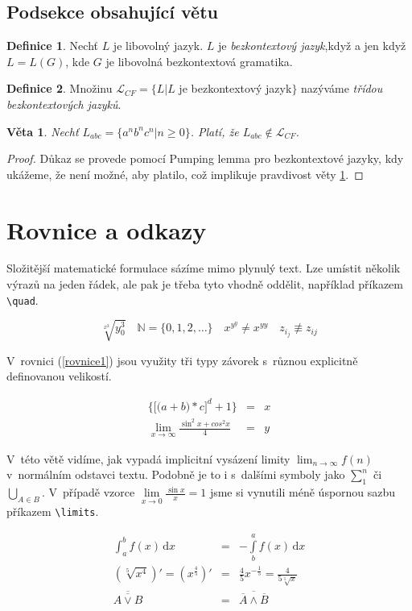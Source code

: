 \documentclass[a4paper,11pt,twocolumn]{article}
\theoremstyle{definition}
\newtheorem{definice}{Definice}[section]
\theoremstyle{plain}
\newtheorem{veta}{Věta}
\theoremstyle{definition}
\begin{document}
\subsection{Podsekce obsahující větu}
\begin{definice}
Nechť $L$ je libovolný jazyk. $L$ je \emph{ bezkontextový jazyk},když a jen když $L = L(G)$, kde $G$ je libovolná bezkontextová gramatika.
\end{definice}
\par
\begin{definice}
Množinu $\mathcal{L}_{CF} = \{L|L$ je bezkontextový jazyk$\}$ nazýváme \emph{třídou bezkontextových jazyků}.
\end{definice}
\par
\begin{veta}\label{veta1}
\emph{Nechť} $L_{abc} = \{a^nb^nc^n|n \geq 0\}$. \emph{Platí, že} $L_{abc} \not\in \mathcal{L}_{CF}$.
\end{veta}
\par
\begin{proof}
 Důkaz se provede pomocí Pumping lemma pro bezkontextové jazyky, kdy ukážeme, že není možné, aby platilo, což implikuje pravdivost věty \ref{veta1}.
\end{proof}
\par

\section{Rovnice a odkazy}
Složitější matematické formulace sázíme mimo plynulý text. Lze umístit několik výrazů na jeden řádek, ale pak je třeba tyto vhodně oddělit, například příkazem \verb|\quad|.
\par
$$\sqrt[x^2]{{y}{^3_0}}\quad\mathbb{N} = \{0, 1, 2,\ldots\} \quad x^{y^y} \neq x^{yy} \quad z_{i_j} \not\equiv z_{ij}$$
\par
V~rovnici (\ref{rovnice1}) jsou využity tři typy závorek s~různou explicitně definovanou velikostí.
\par
\begin{eqnarray}
\bigg\{\Big[\big(a + b\big) * c\Big]^d + 1 \bigg\}& = & x\label{rovnice1} \\
\lim_{x \to \infty}\frac{\sin^2 x + cos^2 x}{4} &=& y \nonumber
\end{eqnarray}
\par
V~této větě vidíme, jak vypadá implicitní vysázení limity $\lim_{n \to \infty}{f(n)}$ v~normálním odstavci textu. Podobně je to i s~dalšími symboly jako $\sum_1^n$ či $\bigcup_{A\in{B}}$.
V~případě vzorce $\lim\limits_{x \to 0}\frac{\sin x}{x}=1$ jsme si vynutili méně úspornou sazbu příkazem \verb|\limits|.
\par
\begin{eqnarray}
  \int_a^b f(x)\,\mathrm{d}x &=& -\int\limits_b^a f(x)\,\mathrm{d}x \\
  \left(\sqrt[5]{x^4}\right)' = \left(x^{\frac{4}{5}}\right)' &=& \frac{4}{5}x^{-\frac{1}{5}} = \frac{4}{5\sqrt[5]{x}}\\
 \overline{\overline{A \vee B}} &=& \overline{\overline{A} \wedge \overline{B}}
\end{eqnarray}
\par
\end{document}
